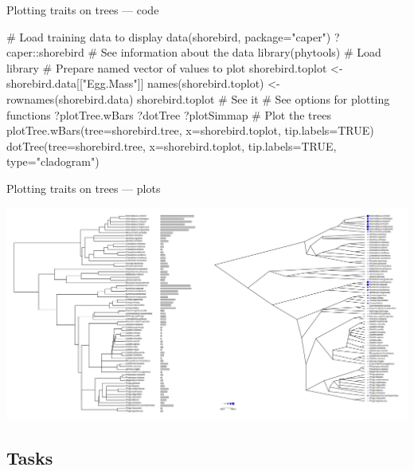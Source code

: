 \documentclass[compress, ucs, xelatex, 11pt, xcolor=svgnames, aspectratio=169,
	hyperref={
		bookmarks=true,
		unicode=true,
		colorlinks=true,
		pdftitle={Molecular data in R},
		plainpages=false,
		pdfauthor={Vojtech Zeisek},
		pdfsubject={Course about phylogeny and evolution in R},
		pdfcreator={XeLaTeX},
		pdfkeywords={R, evolution, phylogeny, molecular data},
		linkcolor=Crimson, %
		anchorcolor=Magenta, %
		citecolor=Magenta, %
		filecolor=Magenta, %
		menucolor=Magenta, %
		urlcolor=DodgerBlue, %
		pdftex},
	url={hyphens, lowtilde} %
	]{beamer}
\begin{document}
\begin{frame}[fragile]{Plotting traits on trees --- code}
	\begin{spluscode}
    # Load training data to display
    data(shorebird, package="caper")
    ?caper::shorebird # See information about the data
    library(phytools) # Load library
    # Prepare named vector of values to plot
    shorebird.toplot <- shorebird.data[["Egg.Mass"]]
    names(shorebird.toplot) <- rownames(shorebird.data)
    shorebird.toplot # See it
    # See options for plotting functions
    ?plotTree.wBars
    ?dotTree
    ?plotSimmap
    # Plot the trees
    plotTree.wBars(tree=shorebird.tree, x=shorebird.toplot,
      tip.labels=TRUE)
    dotTree(tree=shorebird.tree, x=shorebird.toplot, tip.labels=TRUE,
      type="cladogram")
	\end{spluscode}
\end{frame}

\begin{frame}{Plotting traits on trees --- plots}
	\begin{center}
		\includegraphics[width=\textwidth-2cm]{treeval.png}
	\end{center}
\end{frame}

%
%

\subsection{Tasks}
\end{document}
